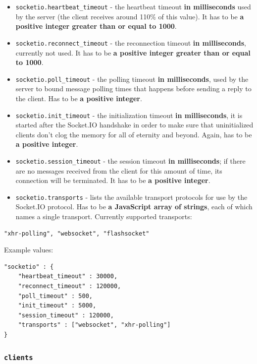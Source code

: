 \documentclass[a4paper]{article}
\begin{document}
\begin{itemize}
\item \texttt{socketio.heartbeat\_timeout} - the heartbeat timeout \textbf{in milliseconds} used by the server (the client receives around 110\% of this value). It has to be \textbf{a positive integer greater than or equal to 1000}.
\item \texttt{socketio.reconnect\_timeout} - the reconnection timeout \textbf{in milliseconds}, currently not used. It has to be \textbf{a positive integer greater than or equal to 1000}.
\item \texttt{socketio.poll\_timeout} - the polling timeout \textbf{in milliseconds}, used by the server to bound message polling times that happens before sending a reply to the client. Has to be \textbf{a positive integer}.
\item \texttt{socketio.init\_timeout} - the initialization timeout \textbf{in milliseconds}, it is started after the Socket.IO handshake in order to make sure that uninitialized clients don't clog the memory for all of eternity and beyond. Again, has to be \textbf{a positive integer}.
\item \texttt{socketio.session\_timeout} - the session timeout \textbf{in milliseconds}; if there are no messages received from the client for this amount of time, its connection will be terminated. It has to be \textbf{a positive integer}.
\item \texttt{socketio.transports} - lists the available transport protocols for use by the Socket.IO protocol. Has to be \textbf{a JavaScript array of strings}, each of which names a single transport. Currently supported transports:
\end{itemize}


\begin{verbatim}
"xhr-polling", "websocket", "flashsocket"
\end{verbatim}




\noindent
Example values:


\begin{verbatim}
"socketio" : {
    "heartbeat_timeout" : 30000,
    "reconnect_timeout" : 120000,
    "poll_timeout" : 500,
    "init_timeout" : 5000,
    "session_timeout" : 120000,
    "transports" : ["websocket", "xhr-polling"]
}
\end{verbatim}
\subsubsection{\texttt{clients}}
\label{sec-3-1-3}
\end{document}
